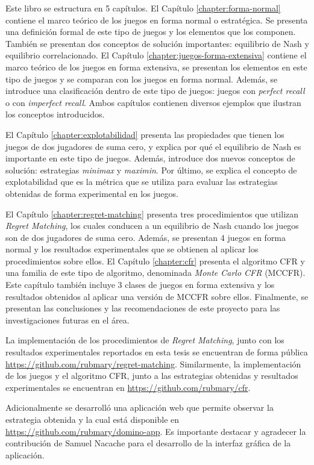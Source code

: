 Este libro se estructura en 5 capítulos. El Capítulo \ref{chapter:forma-normal} contiene el marco teórico de los juegos en forma normal o estratégica. Se presenta una definición formal de este tipo de juegos y los elementos que los componen. También se presentan dos conceptos de solución importantes: equilibrio de Nash y equilibrio correlacionado. El Capítulo \ref{chapter:juegos-forma-extensiva} contiene el marco teórico de los juegos en forma extensiva, se presentan los elementos en este tipo de juegos y se comparan con los juegos en forma normal. Además, se introduce una clasificación dentro de este tipo de juegos: juegos con \textit{perfect recall} o con \textit{imperfect recall}. Ambos capítulos contienen diversos ejemplos que ilustran los conceptos introducidos.

El Capítulo \ref{chapter:explotabilidad} presenta las propiedades que tienen los juegos de dos jugadores de suma cero, y explica por qué el equilibrio de Nash es importante en este tipo de juegos. Además, introduce dos nuevos conceptos de solución: estrategias \textit{minimax} y \textit{maximin}. Por último, se explica el concepto de explotabilidad que es la métrica que se utiliza para evaluar las estrategias obtenidas de forma experimental en los juegos.

El Capítulo \ref{chapter:regret-matching} presenta tres procedimientos que utilizan \textit{Regret Matching}, los cuales conducen a un equilibrio de Nash cuando los juegos son de dos jugadores de suma cero. Además, se presentan 4 juegos en forma normal y los resultados experimentales que se obtienen al aplicar los procedimientos sobre ellos. El Capítulo \ref{chapter:cfr} presenta el algoritmo CFR y una familia de este tipo de algoritmo, denominada \textit{Monte Carlo CFR} (MCCFR). Este capítulo también incluye 3 clases de juegos en forma extensiva y los resultados obtenidos al aplicar una versión de MCCFR sobre ellos. Finalmente, se presentan las conclusiones y las recomendaciones de este proyecto para las investigaciones futuras en el área.

La implementación de los procedimientos de \textit{Regret Matching}, junto con los resultados experimentales reportados en esta tesis se encuentran de forma pública \url{https://github.com/rubmary/regret-matching}. Similarmente, la implementación de los juegos y el algoritmo CFR, junto a las estrategias obtenidas y resultados experimentales se encuentran en \url{https://github.com/rubmary/cfr}.

Adicionalmente se desarrolló una aplicación web que permite observar la estrategia obtenida y la cual está disponible en \url{https://github.com/rubmary/domino-app}. Es importante destacar y agradecer la contribución de Samuel Nacache para el desarrollo de la interfaz gráfica de la aplicación.